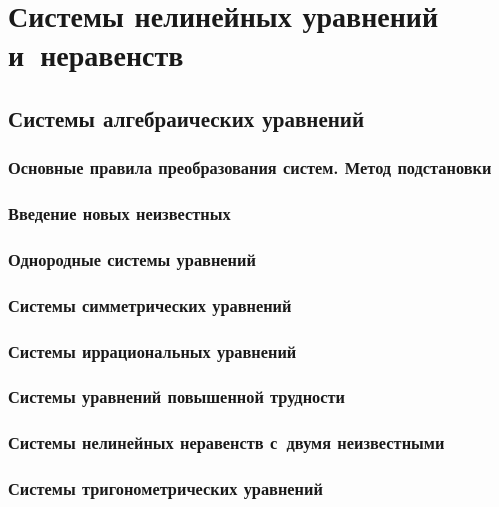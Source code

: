 \documentclass[14pt, oneside]{extbook}
\begin{document}
\chapter{Системы нелинейных уравнений и~неравенств}
\section{Системы алгебраических уравнений}
\subsection{Основные правила преобразования систем. Метод подстановки}

\subsection{Введение новых неизвестных}

\subsection{Однородные системы уравнений}

\subsection{Системы симметрических уравнений}

\subsection{Системы иррациональных уравнений}

\subsection{Системы уравнений повышенной трудности}

\subsection{Системы нелинейных неравенств с~двумя неизвестными}

\subsection{Системы тригонометрических уравнений}

\end{document}
